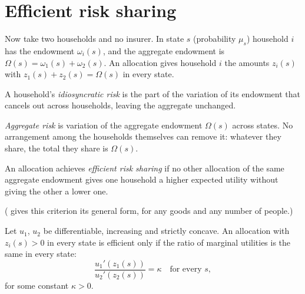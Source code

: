 \section{Efficient risk sharing}\label{sec:b2:insurance-and-risk-sharing:sharing}

Now take two households and no insurer. In state $s$ (probability $\mu_s$) household $i$ has the
endowment $\omega_i(s)$, and the aggregate endowment is $\Omega(s) = \omega_1(s) + \omega_2(s)$. An
allocation gives household $i$ the amounts $z_i(s)$ with $z_1(s) + z_2(s) = \Omega(s)$ in every
state.

\begin{definition}\label{def:b2:insurance-and-risk-sharing:idiosyncratic-risk}
A household's \emph{idiosyncratic risk} is the part of the variation of its
endowment that cancels out across households, leaving the aggregate unchanged.
\end{definition}

\begin{definition}\label{def:b2:insurance-and-risk-sharing:aggregate-risk}
\emph{Aggregate risk} is variation of the aggregate endowment $\Omega(s)$ across
states. No arrangement among the households themselves can remove it: whatever they share, the total
they share is $\Omega(s)$.
\end{definition}

\begin{definition}\label{def:b2:insurance-and-risk-sharing:efficient-risk-sharing}
An allocation achieves \emph{efficient risk sharing} if no other
allocation of the same aggregate endowment gives one household a higher expected utility without
giving the other a lower one.
\end{definition}

( gives this criterion its general form, for any goods and any number
of people.)

\begin{proposition}\label{prop:b2:insurance-and-risk-sharing:borch}
Let $u_1$, $u_2$ be differentiable, increasing and strictly concave. An allocation with $z_i(s) > 0$
in every state is efficient only if the ratio of marginal utilities is the same in every state:
\[
\frac{u_1'(z_1(s))}{u_2'(z_2(s))} = \kappa \quad\text{for every } s,
\]
for some constant $\kappa > 0$.
\end{proposition}

